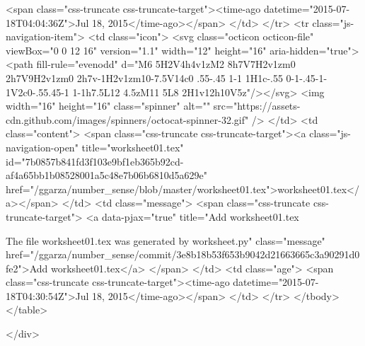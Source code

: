             <span class="css-truncate css-truncate-target"><time-ago datetime="2015-07-18T04:04:36Z">Jul 18, 2015</time-ago></span>
          </td>
        </tr>
        <tr class="js-navigation-item">
          <td class="icon">
            <svg class="octicon octicon-file" viewBox="0 0 12 16" version="1.1" width="12" height="16" aria-hidden="true"><path fill-rule="evenodd" d="M6 5H2V4h4v1zM2 8h7V7H2v1zm0 2h7V9H2v1zm0 2h7v-1H2v1zm10-7.5V14c0 .55-.45 1-1 1H1c-.55 0-1-.45-1-1V2c0-.55.45-1 1-1h7.5L12 4.5zM11 5L8 2H1v12h10V5z"/></svg>
            <img width="16" height="16" class="spinner" alt="" src="https://assets-cdn.github.com/images/spinners/octocat-spinner-32.gif" />
          </td>
          <td class="content">
            <span class="css-truncate css-truncate-target"><a class="js-navigation-open" title="worksheet01.tex" id="7b0857b841fd3f103e9bf1eb365b92cd-af4a65bb1b08528001a5c48e7b06b6810d5a629e" href="/ggarza/number_sense/blob/master/worksheet01.tex">worksheet01.tex</a></span>
          </td>
          <td class="message">
            <span class="css-truncate css-truncate-target">
                  <a data-pjax="true" title="Add worksheet01.tex

The file worksheet01.tex was generated by worksheet.py" class="message" href="/ggarza/number_sense/commit/3e8b18b53f653b9042d21663665c3a90291d0fe2">Add worksheet01.tex</a>
            </span>
          </td>
          <td class="age">
            <span class="css-truncate css-truncate-target"><time-ago datetime="2015-07-18T04:30:54Z">Jul 18, 2015</time-ago></span>
          </td>
        </tr>
    </tbody>
  </table>

</div>



